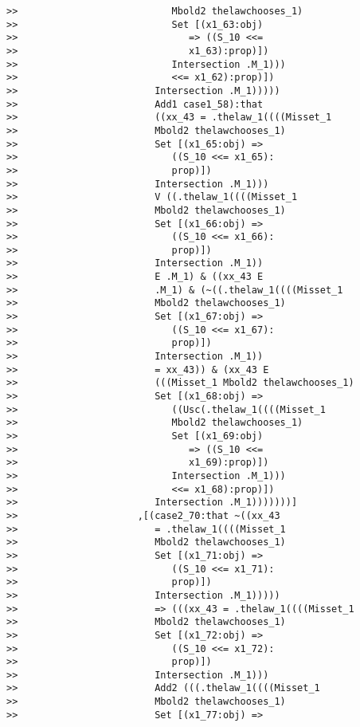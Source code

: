 \documentclass[12pt]{article}
\begin{document}
\begin{verbatim}
>>                           Mbold2 thelawchooses_1)
>>                           Set [(x1_63:obj)
>>                              => ((S_10 <<=
>>                              x1_63):prop)])
>>                           Intersection .M_1)))
>>                           <<= x1_62):prop)])
>>                        Intersection .M_1)))))
>>                        Add1 case1_58):that
>>                        ((xx_43 = .thelaw_1((((Misset_1
>>                        Mbold2 thelawchooses_1)
>>                        Set [(x1_65:obj) =>
>>                           ((S_10 <<= x1_65):
>>                           prop)])
>>                        Intersection .M_1)))
>>                        V ((.thelaw_1((((Misset_1
>>                        Mbold2 thelawchooses_1)
>>                        Set [(x1_66:obj) =>
>>                           ((S_10 <<= x1_66):
>>                           prop)])
>>                        Intersection .M_1))
>>                        E .M_1) & ((xx_43 E
>>                        .M_1) & (~((.thelaw_1((((Misset_1
>>                        Mbold2 thelawchooses_1)
>>                        Set [(x1_67:obj) =>
>>                           ((S_10 <<= x1_67):
>>                           prop)])
>>                        Intersection .M_1))
>>                        = xx_43)) & (xx_43 E
>>                        (((Misset_1 Mbold2 thelawchooses_1)
>>                        Set [(x1_68:obj) =>
>>                           ((Usc(.thelaw_1((((Misset_1
>>                           Mbold2 thelawchooses_1)
>>                           Set [(x1_69:obj)
>>                              => ((S_10 <<=
>>                              x1_69):prop)])
>>                           Intersection .M_1)))
>>                           <<= x1_68):prop)])
>>                        Intersection .M_1)))))))]
>>                     ,[(case2_70:that ~((xx_43
>>                        = .thelaw_1((((Misset_1
>>                        Mbold2 thelawchooses_1)
>>                        Set [(x1_71:obj) =>
>>                           ((S_10 <<= x1_71):
>>                           prop)])
>>                        Intersection .M_1)))))
>>                        => (((xx_43 = .thelaw_1((((Misset_1
>>                        Mbold2 thelawchooses_1)
>>                        Set [(x1_72:obj) =>
>>                           ((S_10 <<= x1_72):
>>                           prop)])
>>                        Intersection .M_1)))
>>                        Add2 (((.thelaw_1((((Misset_1
>>                        Mbold2 thelawchooses_1)
>>                        Set [(x1_77:obj) =>

\end{verbatim}
\end{document}

